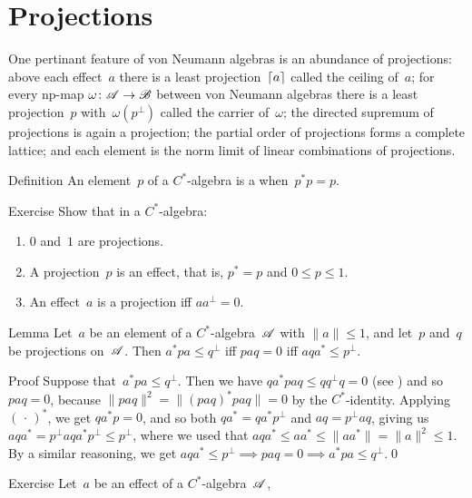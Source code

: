 \documentclass[a]{subfiles}
\begin{document}
\section{Projections}
\begin{parsec}%
\begin{point}%
One pertinant feature
of von Neumann algebras
is an abundance of projections:
above each effect~$a$ 
there is a least projection~$\left\lceil a\right\rceil$
called the ceiling of~$a$;
for every np-map $\omega\colon \mathscr{A}\to \mathscr{B}$
between von Neumann algebras
there is a least projection~$p$ with~$\omega(p^\perp)$
called the carrier of~$\omega$;
the directed supremum of projections is again a projection;
the partial order of projections forms a complete lattice;
and each element is the norm limit
of linear combinations of projections.
\end{point}
\begin{point}{Definition}%
An element~$p$ of a $C^*$-algebra
is a 
when~$p^*p=p$.
\end{point}
\begin{point}{Exercise}%
Show that in a $C^*$-algebra:
\begin{enumerate}
\item
$0$ and~$1$ are projections.
\item
A projection~$p$ is an effect,
that is, $p^*=p$
and $0\leq p\leq 1$.
\item
An effect~$a$ is a projection iff $aa^\perp=0$.
\end{enumerate}
\end{point}
\begin{point}[ad-contraposed]{Lemma}%
Let~$a$ be an element of a $C^*$-algebra~$\mathscr{A}$
with $\|a\|\leq 1$,
and let~$p$ and~$q$ be projections on~$\mathscr{A}$.
Then 
$a^* p a \leq q^\perp$
iff $paq=0$
iff  $aqa^*\leq p^\perp$.
\begin{point}{Proof}%
Suppose that~$a^*pa\leq q^\perp$.
Then we have $q a^*pa q \leq qq^\perp q = 0$
(see )
and so $paq=0$,
because $\|paq\|^2=\|(paq)^*paq\|=0$
by the $C^*$-identity.
Applying $(\,\cdot\,)^*$,
we get $qa^*p=0$, and so both $qa^* = qa^*p^\perp$
and $aq = p^\perp aq$, giving
us $aqa^* = p^\perp a q a^* p^\perp 
\leq p^\perp$,
where we used that $aqa^*\leq aa^*\leq \|aa^*\|=\|a\|^2\leq 1$.
By a similar reasoning,
we get $aqa^*\leq p^\perp \implies paq=0\implies a^*pa\leq q^\perp$.\qed
\end{point}
\end{point}
\begin{point}{Exercise}%
Let~$a$ be an effect of a $C^*$-algebra~$\mathscr{A}$,

\end{point}
\end{parsec}
\end{document}

